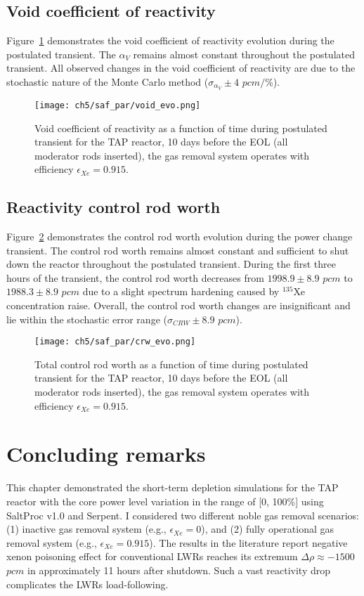 \subsection{Void coefficient of reactivity}
Figure~\ref{fig:lf-tap-void-evo} demonstrates the void coefficient of 
reactivity evolution during the postulated transient. 
The $\alpha_V$ remains almost constant throughout the postulated transient. 
All observed changes in the void coefficient of reactivity are due to the
stochastic nature of the Monte Carlo method ($\sigma_{\alpha_V}\pm4$ $pcm/$\%).
\begin{figure}[htp!] %
	\centering
	\texttt{[image: ch5/saf\_par/void\_evo.png]}
	\caption{Void coefficient of reactivity as a function of time during 
	postulated transient for the \gls{TAP} reactor, 10 days before the 
	\gls{EOL} (all moderator rods inserted), the gas removal system operates 
	with efficiency $\epsilon_{Xe}=0.915$.}
	\label{fig:lf-tap-void-evo}
\end{figure}

\subsection{Reactivity control rod worth}
Figure~\ref{fig:lf-tap-crw-evo} demonstrates the control rod worth evolution 
during the power change transient. The control rod worth remains almost 
constant and sufficient to shut down the reactor throughout the postulated 
transient. During the first three hours of the transient, the control rod 
worth decreases from $1998.9\pm8.9$ $pcm$ to $1988.3\pm8.9$ $pcm$ due to a 
slight spectrum hardening caused by $^{135}$Xe concentration raise. Overall, 
the control rod worth changes are insignificant and lie within the 
stochastic error range ($\sigma_{CRW}\pm8.9$ $pcm$).
\begin{figure}[htp!] %
	\centering
	\texttt{[image: ch5/saf\_par/crw\_evo.png]}
	\caption{Total control rod worth as a function of time during postulated 
	transient for the \gls{TAP} reactor, 10 days before the \gls{EOL} (all 
	moderator rods inserted), the gas removal system operates with efficiency 
	$\epsilon_{Xe}=0.915$.}
	\label{fig:lf-tap-crw-evo}
\end{figure}


\section{Concluding remarks}
This chapter demonstrated the short-term depletion simulations for the 
\gls{TAP} reactor with the core power level variation in the range of [0, 
100\%] using SaltProc v1.0 and Serpent. I considered two different noble gas 
removal scenarios: (1) inactive gas removal system (e.g., $\epsilon_{Xe}=0$), 
and (2) fully operational gas removal system (e.g., $\epsilon_{Xe}=0.915$). 
The results in the literature report negative xenon poisoning effect for 
conventional \glspl{LWR} reaches its extremum $\Delta\rho\approx-1500$ $pcm$ 
in approximately 11 hours after shutdown. Such a vast reactivity drop 
complicates the \glspl{LWR} load-following.

